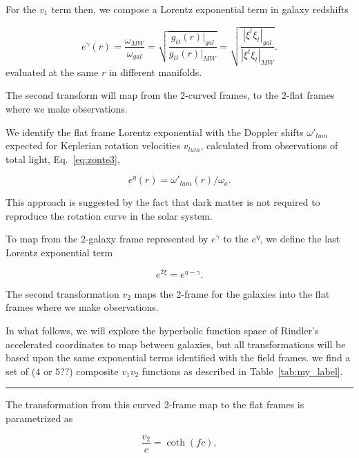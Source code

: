 \documentclass[reprint,%
 amsmath,amssymb,
 aps,
]{revtex4-1}
\begin{document}
For the $v_1$ term then, we compose a   Lorentz exponential term  in galaxy redshifts
 
     \begin{equation}
     e^{\gamma}(r)=  \frac{\omega_{MW}}{\omega_{gal}}  =\sqrt{\frac{g_{tt}(r)|_{gal}}{g_{tt}(r)|_{MW}}} =\sqrt{\frac{|\xi^t\xi_{t}|_{gal}}{|\xi^t\xi_{t}|_{MW}}}. 
      \label{eq:gravRS}
    \end{equation}
 evaluated at the same $r$ in different manifolds. 
   
 
The  second transform will map  from the 2-curved frames, to the 2-flat frames  where we make observations.

We identify the flat frame Lorentz exponential with the Doppler shifts $\omega'_{lum}$ expected for      Keplerian rotation velocities $v_{lum}$,   calculated from  observations of total light, Eq.~\ref{eq:zonte3},

\begin{equation}
    e^{\eta}(r)=\omega'_{lum}(r)/\omega_o.  
    \label{eq:flat}
  \end{equation} 
  
 This approach is suggested by   the fact that dark matter is not required to reproduce the rotation curve in the  solar system.  


To map from the  2-galaxy frame represented by $ e^{\gamma}$ to the $ e^{\eta}$, we define the last   Lorentz exponential term
 

\begin{equation}
    e^{2\xi}=   e^{\eta-\gamma}  .
\end{equation}

 
 
 
 The second transformation  $v_2$ maps the 2-frame for the galaxies into the flat frames where we make observations. 



In what follows, we will explore the hyperbolic function space of  Rindler's accelerated coordinates to map between galaxies, but all transformations will be based upon the same exponential terms identified with the field frames.
 we find a set of ($4$ or $5$??) composite $v_1 v_2$ functions as described in Table~\ref{tab:my_label}.
{\color{pink} \rule{\linewidth}{0.5mm}}


  
  The transformation from this curved 2-frame map to the flat frames is parametrized as 
  
   
  
  \begin{equation}
\frac{v_{2} }{c}=  \coth (fc),
\label{eq:hyperbolico}
\end{equation}
\end{document}
